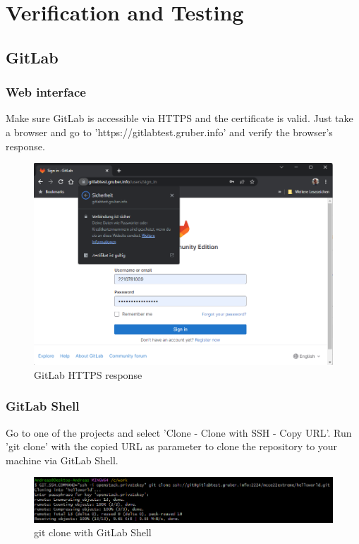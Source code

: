 \chapter{Verification and Testing}

\section{GitLab}

\subsection{Web interface}

Make sure GitLab is accessible via HTTPS and the certificate is valid.
Just take a browser and go to 'https://gitlabtest.gruber.info' and verify the browser's response.

\begin{figure}[H]
	\centering
	\includegraphics[width=14cm]{images/gitlab_signin.png}
	\caption{GitLab HTTPS response}
	\label{fig:gitlab_response}
\end{figure}

\subsection{GitLab Shell}

Go to one of the projects and select 'Clone - Clone with SSH - Copy URL'.
Run 'git clone' with the copied URL as parameter to clone the repository to your machine via GitLab Shell.

\begin{figure}[H]
	\centering
	\includegraphics[width=14cm]{images/gitlab_shell_clone.png}
	\caption{git clone with GitLab Shell}
	\label{fig:gitlab_shell_clone}
\end{figure}

